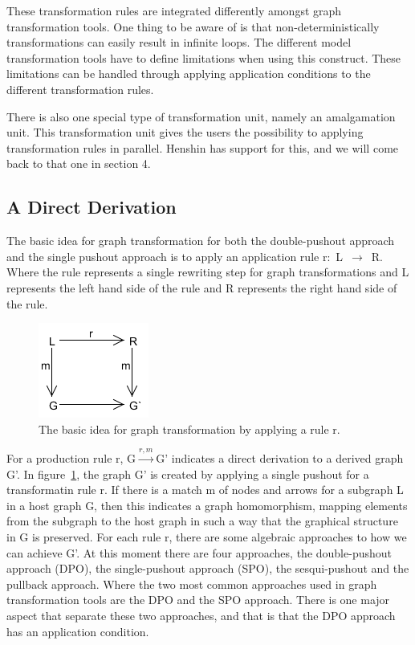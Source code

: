 \documentclass[pdftex,11pt,a4paper]{article}
\begin{document}
These transformation rules are integrated differently amongst graph
transformation tools. One thing to be aware of is that non-deterministically
transformations can easily result in infinite loops. The different model
transformation tools have to define limitations when using this construct. These
limitations can be handled through applying application conditions to the
different transformation rules.

There is also one special type of transformation unit, namely an amalgamation
unit. This transformation unit gives the users the possibility to applying
transformation rules in parallel. Henshin has support for this, and we will come
back to that one in section 4.

\subsection{A Direct Derivation}
\noindent The basic idea for graph transformation for both the double-pushout
approach and the single pushout approach is to apply an application rule
\mbox{r: L $\longrightarrow$ R}. Where the rule represents a single rewriting
step for graph transformations and L represents the left hand side of the rule and R
represents the right hand side of the rule.

\begin{figure}[H]
	\centering
	\includegraphics[scale=0.7]{figures/GraphTransformationGeneral.png}
	\caption{The basic idea for graph transformation by applying a rule r.}
	\label{fig:GraphTransformationGeneral}
\end{figure}

For a production rule r, \mbox{G$\xrightarrow{r,m}$G'} indicates a direct
derivation to a derived graph G'. In
figure~\ref{fig:GraphTransformationGeneral}, the graph G' is created by
applying a single pushout for a transformatin rule r. If there is a match m of
nodes and arrows for a subgraph L in a host graph G, then this indicates a
graph homomorphism, mapping elements from the subgraph to the host graph in
such a way that the graphical structure in G is preserved. For each rule r,
there are some algebraic approaches to how we can achieve G'. At this moment
there are four approaches, the double-pushout approach (DPO), the
single-pushout approach (SPO), the sesqui-pushout and the pullback approach.
Where the two most common approaches used in graph transformation tools are the
DPO and the SPO approach. There is one major aspect that separate these two
approaches, and that is that the DPO approach has an application condition.
\end{document}
